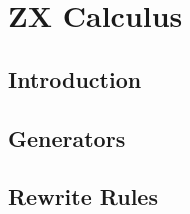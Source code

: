 

\section{ZX Calculus}
\subsection{Introduction}
\subsection{Generators}
\subsection{Rewrite Rules}


